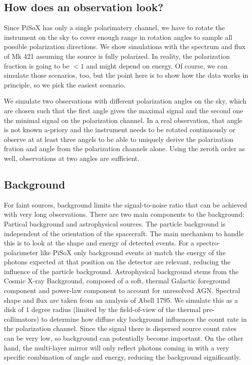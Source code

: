\documentclass[]{spie}  %
\begin{document}
\subsection{How does an observation look?}
Since PiSoX has only a single polarimatery channel, we have to rotate
the instrument on the sky to cover enough range in rotation angles to
sample all possible polarization directions. We show simulations with
the spectrum and flux of Mk 421 assuming the source is fully
polarized. In reality, the polarization fraction is going to be $<1$
and might depend on energy. Of course, we can simulate those
scenarios, too, but the point here is to show how the data works in
principle, so we pick the easiest scenario.

We simulate two observations with different polarization angles on the
sky, which are chosen such that the first angle gives the maximal
signal and the second one the minimal signal on the polarization
channel. In a real observation, that angle is not known a-priory and
the instrument needs to be rotated continuously or observe at at least
three angels to be able to uniquely derive the polarization fration
and angle from the polarization channels alone. Using the zeroth order
as well, observations at two angles are sufficient.

\subsection{Background}
For faint sources, background limits the signal-to-noise ratio that
can be achieved with very long observations. There are two main
components to the background: Partical background and astrophysical
sources. The particle background is independent of the orientation of
the spacecraft. The main mechanism to handle this is to look at the
shape and energy of detected events. For a spectro-polarimeter like
PiSoX only background events at match the energy of the photons
expected at that position on the detector are relevant, reducing the
influence of the particle background. Astrophysical background stems
from the Cosmic X-ray Background, composed of a soft, thermal Galactic
foreground component and power-law component to account for unresolved
AGN. Spectral shape and flux are taken from an analysis of Abell
1795\cite{2009PASJ...61.1117B}.  We simulate this as a disk of 1
degree radius (limited by the field-of-view of the thermal
pre-collimators) to determine how diffuse sky background influences
the count rate in the polarization channel. Since the signal there is
dispersed source count rates can be very low, so background can
potentially become important. On the other hand, the multi-layer
mirror will only reflect photons coming in with a very specific
combination of angle and energy, reducing the background
significantly.
\end{document}
